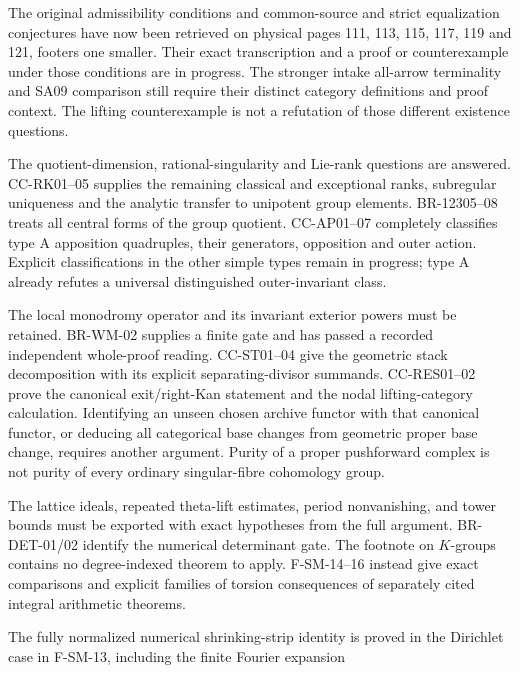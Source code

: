 \documentclass[11pt,a4paper]{article}
\theoremstyle{definition}\newtheorem{definition}[theorem]{Definition}
\theoremstyle{remark}\newtheorem{remark}[theorem]{Remark}
\begin{document}
\begin{description}[style=nextline,leftmargin=0pt,labelwidth=0pt,labelsep=0pt]
The original admissibility conditions and common-source and strict
equalization conjectures have now been retrieved on physical pages
111, 113, 115, 117, 119 and 121, footers one smaller. Their exact
transcription and a proof or counterexample under those conditions
are in progress. The stronger intake all-arrow terminality and SA09
comparison still require their distinct category definitions and proof
context. The lifting counterexample is not a refutation of those
different existence questions.
\item[Cote 123: apposition outside type A.]
The quotient-dimension, rational-singularity and Lie-rank questions
are answered. CC-RK01--05 supplies the remaining classical and
exceptional ranks, subregular uniqueness and the analytic transfer
to unipotent group elements. BR-12305--08 treats all central forms
of the group quotient. CC-AP01--07 completely classifies type A
apposition quadruples, their generators, opposition and outer action.
Explicit classifications in the other simple types remain in progress;
type A already refutes a universal distinguished outer-invariant class.
\item[Weight--monodromy and universal-curve categories.]
The local monodromy operator and its invariant exterior powers must
be retained. BR-WM-02 supplies a finite gate and has passed a
recorded independent whole-proof reading. CC-ST01--04 give the geometric
stack decomposition with its explicit separating-divisor summands.
CC-RES01--02 prove the canonical exit/right-Kan statement and the nodal
lifting-category calculation. Identifying an unseen chosen archive
functor with that canonical functor, or deducing all categorical base
changes from geometric proper base change, requires another argument.
Purity of a proper pushforward
complex is not purity of every ordinary singular-fibre cohomology group.
\item[The analytic method as a transferable theorem.]
The lattice ideals, repeated theta-lift estimates, period nonvanishing,
and tower bounds must be exported with exact hypotheses from the
full argument. BR-DET-01/02 identify the numerical determinant gate.
The footnote on $K$-groups contains no degree-indexed theorem to apply.
F-SM-14--16 instead give exact comparisons and explicit families of
torsion consequences of separately cited integral arithmetic theorems.
\item[Masullo's operator realization.]
The fully normalized numerical shrinking-strip identity is proved in
the Dirichlet case in F-SM-13, including the finite Fourier expansion

\end{description}
\end{document}

